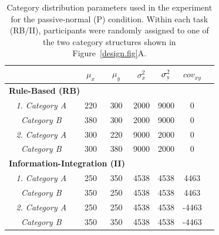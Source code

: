 \documentclass[3p,twocolumn,authoryear,10pt]{elsarticle}
\begin{document}
\begin{table}[t] \caption{\small Category distribution parameters used in the experiment for the passive-normal (P) condition. Within each task (RB/II), participants were randomly assigned to one of the two category structures shown in Figure~\ref{design.fig}A.} %
\centering      %
\begin{tabular}{ l c c c c c c }  %
& \textbf{\small $\mu_x$} & \textbf{\small $\mu_y$} & \textbf{\small $\sigma_x^2$} & $\small{\sigma_y^2}$ & \textbf{\small $cov_{xy}$}\\ [0.1ex] %
\hline                    %
\multicolumn{3}{l}{\textbf{\small Rule-Based (RB)}}  &  &  & \\ [0.5ex] %
  \multicolumn{1}{c}{ \textit{\small 1. Category A}} &   \small{220} &  \small{300} &  \small{2000} &  \small{9000} &  \small{0} \\ [0ex] %
   \multicolumn{1}{c}{\textit{\small \hspace{.1in} Category B}} &   \small{380} &  \small{300} &  \small{2000} &  \small{9000} &  \small{0} \\ [1.5ex] %

  \multicolumn{1}{c}{\textit{\small 2. Category A}} &   \small{300} &  \small{220} &  \small{9000} &  \small{2000} &  \small{0} \\ [0ex] %
   \multicolumn{1}{c}{\textit{\small \hspace{.1in} Category B}} &   \small{300} &  \small{380} &  \small{9000} &  \small{2000} &  \small{0} \\ [1.5ex] %

\hline
\multicolumn{3}{l}{\textbf{\small Information-Integration (II)}}  &  &  & \\ [0.5ex] %
   \multicolumn{1}{c}{\textit{\small 1. Category A}} &    \small{250} &  \small{350} &  \small{4538} &  \small{4538} &  \small{4463} \\ [0ex] %
   \multicolumn{1}{c}{\textit{\small \hspace{.1in} Category B}} &    \small{350} &  \small{250} &  \small{4538} &  \small{4538} &  \small{4463} \\ [0.5ex] %

   \multicolumn{1}{c}{\textit{\small 2. Category A}} &    \small{250} &  \small{250} &  \small{4538} &  \small{4538} &  \small{-4463} \\ [0ex] %
   \multicolumn{1}{c}{\textit{\small \hspace{.1in} Category B}} &    \small{350} &  \small{350} &  \small{4538} &  \small{4538} &  \small{-4463} \\ [0.5ex] %
\hline
\end{tabular} 
\label{catparams.tab}  %
\end{table} 
\end{document}
